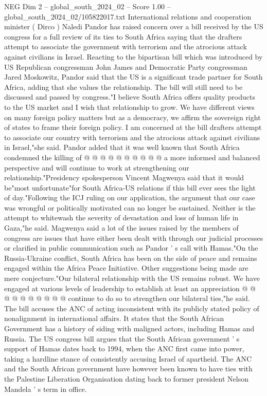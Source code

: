 \begin{textsample}{NEG Dim 2 – global\_south\_2024\_02 – Score 1.00 – global\_south\_2024\_02/105822017.txt}  \label{ex:f2_neg_417}
International relations and cooperation minister ( Dirco ) Naledi Pandor has raised concern over a bill received by the US congress for a full review of its ties to South Africa saying that the drafters attempt to associate the government with terrorism and the atrocious attack against civilians in Israel.
Reacting to the bipartisan bill which was introduced by US Republican congressman John James and Democratic Party congressman Jared Moskowitz, Pandor said that the US is a significant trade partner for South Africa, adding that she values the relationship.
The bill will still need to be discussed and passed by congress."I believe South Africa offers quality products to the US market and I wish that relationship to grow.
We have different views on many foreign policy matters but as a democracy, we affirm the sovereign right of states to frame their foreign policy.
I am concerned at the bill drafters attempt to associate our country with terrorism and the atrocious attack against civilians in Israel,"she said.
Pandor added that it was well known that South Africa condemned the killing of @ @ @ @ @ @ @ @ @ @ a more informed and balanced perspective and will continue to work at strengthening our relationship."Presidency spokesperson Vincent Magwenya said that it would be"most unfortunate"for South Africa-US relations if this bill ever sees the light of day."Following the ICJ ruling on our application, the argument that our case was wrongful or politically motivated can no longer be sustained.
Neither is the attempt to whitewash the severity of devastation and loss of human life in Gaza,"he said.
Magwenya said a lot of the issues raised by the members of congress are issues that have either been dealt with through our judicial processes or clarified in public communication such as Pandor ' s call with Hamas."On the Russia-Ukraine conflict, South Africa has been on the side of peace and remains engaged within the Africa Peace Initiative.
Other suggestions being made are mere conjecture."Our bilateral relationship with the US remains robust.
We have engaged at various levels of leadership to establish at least an appreciation @ @ @ @ @ @ @ @ @ @ continue to do so to strengthen our bilateral ties,"he said.
The bill accuses the ANC of acting inconsistent with its publicly stated policy of nonalignment in international affairs.
It states that the South African Government has a history of siding with maligned actors, including Hamas and Russia.
The US congress bill argues that the South African government ' s support of Hamas dates back to 1994, when the ANC first came into power, taking a hardline stance of consistently accusing Israel of apartheid.
The ANC and the South African government have however been known to have ties with the Palestine Liberation Organisation dating back to former president Nelson Mandela ' s term in office.

\end{textsample}
